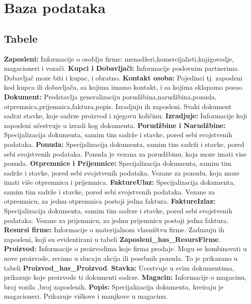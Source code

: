 \section{Baza podataka}

\subsection{Tabele}

\textbf{Zaposleni:}
Informacije o osoblju firme: menadžeri,komercijalisti,knjigovodje,
\newline
magacioneri i vozači.
\newline
\textbf{Kupci i Dobavljači:}
Informacije poslovnim partnerima. Dobavljač moze biti i kupac, i obratno.
\newline
\textbf{Kontakt osoba:}
Pojedinci tj. zaposleni kod kupca ili dobavljača, sa kojima imamo kontakt, i sa kojima sklapamo posao.
\newline
\textbf{Dokument:}
Predstavlja generalizaciju porudžbina,narudžbina,ponuda,
\newline
otpremnica,prijemnica,faktura,popis. Izradjuju ih zaposleni. Svaki dokument sadrzi stavke, koje sadrze proizvod i njegovu količinu.
\newline
\textbf{Izradjuje:}
Informacije koji zaposleni učestvuje u izradi kog dokumenta.
\newline
\textbf{Porudžbine i Narudžbine:}
Specijalizacija dokumenta, samim tim sadrže i stavke, pored sebi svojstvenih podataka.
\newline
\textbf{Ponuda:}
Specijalizacija dokumenta, samim tim sadrži i stavke, pored sebi svojstvenih podataka. Ponuda je vezana za porudžbinu, koja moze imati vise ponuda.
\newline
\textbf{Otpremnice i Prijemnice:}
Specijalizacija dokumenta, samim tim sadrže i stavke, pored sebi svojstvenih podataka. Vezane za ponudu, koja moze imati više otpremnica i prijemnica.
\newline
\textbf{FaktureUlaz:}
Specijalizacija dokumenta, samim tim sadrže i stavke, pored sebi svojstvenih podataka. Vezane za otpremnicu, za jednu otpremnica postoji jedna faktura.
\newline
\textbf{FaktureIzlaz:}
Specijalizacija dokumenta, samim tim sadrze i stavke, pored sebi svojstvenih podataka. Vezane za prijemnicu, za jednu prijemnicu postoji jedna faktura.
\newline
\textbf{Resursi firme:}
Informacije o materijalnom vlasništvu firme. Zaduzuju ih zaposleni, koji su evidentirani u tabeli \textbf{Zaposleni\_has\_ResursFirme}.
\newline
\textbf{Proizvod:}
Informacije o proizvodima koje firma prodaje. Mogu se kombinovati u nove proizvode, recimo u slucaju akcija ili posebnih ponuda. To je prikazano u tabeli \textbf{Proizvod\_has\_Proizvod}.
\newline
\textbf{Stavka:}
Ucestvuje u svim dokumentima, prikazuje koje proizvode ti dokumenti sadrze.
\newline
\textbf{Magacin:}
Informacije o magacinu, broj vozila ,broj zaposlenih.
\textbf{Popis:}
Specijalizacija dokumenta, kreiraju je magacioneri. Prikazuje viškove i manjkove u magacinu.

